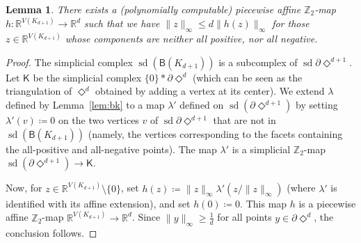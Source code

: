 \documentclass[12pt]{amsart}
\newtheorem{lemma}[theorem]{Lemma}
\theoremstyle{definition}
\def\R{\mathbb{R}}
\def\Z{\mathbb{Z}}
\def\K{\mathsf{K}}
\def\B{\mathsf{B}}
\renewcommand{\geq}{\geqslant}
\renewcommand{\leq}{\leqslant}
\def\sd{\operatorname{sd}}
\begin{document}
\begin{lemma}\label{lem:tech}
There exists a (polynomially computable) piecewise affine $\Z_2$-map $h\colon \R^{V(K_{d+1})}\rightarrow \R^d$ such that we have $\|z\|_{\infty} \leq d \|h(z)\|_{\infty}$ for those $z\in \R^{V(K_{d+1})}$ whose components are neither all positive, nor all negative.
\end{lemma}

\begin{proof}
    The simplicial complex $\sd(\B(K_{d+1}))$ is a subcomplex of $\sd\partial\Diamond^{d+1}$. Let $\K$ be the simplicial complex $\{0\} * \partial\Diamond^d$ (which can be seen as the triangulation of $\Diamond^d$ obtained by adding a vertex at its center). We extend $\lambda$ defined by Lemma~\ref{lem:bk} to a map $\lambda'$ defined on $\sd(\partial\Diamond^{d+1})$ by setting $\lambda'(v) \coloneqq 0$ on the two vertices $v$ of $\sd\partial\Diamond^{d+1}$ that are not in $\sd(\B(K_{d+1}))$ (namely, the vertices corresponding to the facets containing the all-positive and all-negative points). The map $\lambda'$ is a simplicial $\Z_2$-map $\sd(\partial\Diamond^{d+1}) \rightarrow \K$.

    Now, for $z \in \R^{V(K_{d+1})} \setminus\{0\}$, set $h(z) \coloneqq \|z\|_{\infty}\lambda'(z/\|z\|_{\infty})$ (where $\lambda'$ is identified with its affine extension), and set $h(0)\coloneqq 0$. This map $h$ is a piecewise affine $\Z_2$-map $\R^{V(K_{d+1})}\rightarrow \R^d$. Since $\|y\|_{\infty} \geq \frac 1 d$ for all points $y \in \partial \Diamond^d$, the conclusion follows.
\end{proof}
\end{document}
